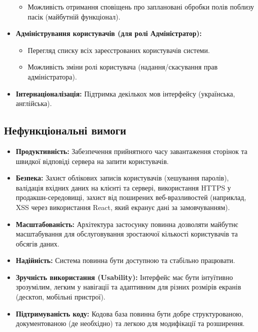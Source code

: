 \begin{itemize}
\begin{itemize}
            \item Можливість отримання сповіщень про заплановані обробки полів поблизу пасік (майбутній функціонал).
        \end{itemize}
    \item \textbf{Адміністрування користувачів (для ролі Адміністратор):}
        \begin{itemize}
            \item Перегляд списку всіх зареєстрованих користувачів системи.
            \item Можливість зміни ролі користувача (надання/скасування прав адміністратора).
        \end{itemize}
    \item \textbf{Інтернаціоналізація:} Підтримка декількох мов інтерфейсу (українська, англійська).
\end{itemize}

\subsection{Нефункціональні вимоги}
\begin{itemize}
    \item \textbf{Продуктивність:} Забезпечення прийнятного часу завантаження сторінок та швидкої відповіді сервера на запити користувачів.
    \item \textbf{Безпека:} Захист облікових записів користувачів (хешування паролів), валідація вхідних даних на клієнті та сервері, використання HTTPS у продакшн-середовищі, захист від поширених веб-вразливостей (наприклад, XSS через використання React, який екранує дані за замовчуванням).
    \item \textbf{Масштабованість:} Архітектура застосунку повинна дозволяти майбутнє масштабування для обслуговування зростаючої кількості користувачів та обсягів даних.
    \item \textbf{Надійність:} Система повинна бути доступною та стабільно працювати.
    \item \textbf{Зручність використання (Usability):} Інтерфейс має бути інтуїтивно зрозумілим, легким у навігації та адаптивним для різних розмірів екранів (десктоп, мобільні пристрої).
    \item \textbf{Підтримуваність коду:} Кодова база повинна бути добре структурованою, документованою (де необхідно) та легкою для модифікації та розширення.
\end{itemize}

